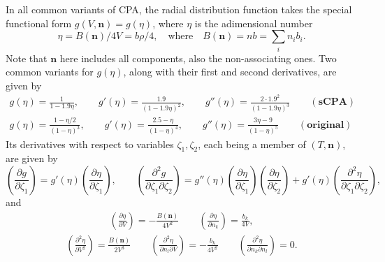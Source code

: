 \documentclass[english]{../thermomemo/thermomemo}
\newcommand{\mbf}[0]{\mathbf}
\newcommand*{\pder}[2]{\left(\frac{\partial #1}{\partial #2}\right)}
\newcommand*{\pdder}[2]{\left(\frac{\partial^2 #1}{\partial #2^2}\right)}
\newcommand*{\pdcross}[3]{\left(\frac{\partial^2 #1}{\partial #2 \partial #3}\right)}
\newcommand{\lp}{\left(}
\newcommand{\rp}{\right)}
\begin{document}
In all common variants of CPA, the radial distribution function takes the special functional form $g(V,\mbf n) = g(\eta)$, where $\eta$ is the adimensional number
$$
\eta = B(\mbf n)/4V = b\rho/4, \quad \text{where} \quad B(\mbf n) = nb = \sum_i n_i b_i.
$$
Note that $\mbf n$ here includes all components, also the non-associating ones. Two common variants for $g(\eta)$, along with their first and second derivatives, are given by
\begin{align*}
  g(\eta) = \frac{1}{1-1.9 \eta}, \qquad g'(\eta) = \frac{1.9}{(1-1.9\eta)^2}, \qquad g''(\eta) = \frac{2 \cdot 1.9^2}{(1-1.9\eta)^3} \qquad \mathbf{(sCPA)} \\
  g(\eta) = \frac{1-\eta/2}{(1- \eta)^3}, \qquad g'(\eta) = \frac{2.5-\eta}{(1-\eta)^4}, \qquad g''(\eta) = \frac{3\eta-9}{(1-\eta)^5} \qquad \mathbf{(original)}
\end{align*}
Its derivatives with respect to variables $\zeta_1,\zeta_2$, each being a member of $(T,\mbf n)$, are given by
\begin{equation}
  \pder{g}{\zeta_1} = g'(\eta) \pder{\eta}{\zeta_1}, \qquad \pdcross{g}{\zeta_1}{\zeta_2} = g''(\eta) \pder{\eta}{\zeta_1} \pder{\eta}{\zeta_2} + g'(\eta) \pdcross{\eta}{\zeta_1}{\zeta_2},
\end{equation}
and
\begin{align}
 \pder{\eta}{V} = -\frac{B(\mbf n)}{4V^2} \qquad  \pder{\eta}{n_k} = \frac{b_k}{4V},
\end{align}
\begin{align}
  \pdder{\eta}{V} = \frac{B(\mbf n)}{2V^3} \qquad \pdcross{\eta}{n_l}{V}  = -\frac{b_k}{4V^2} \qquad  \pdcross{\eta}{n_k}{n_l} = 0.
\end{align}
\end{document}
